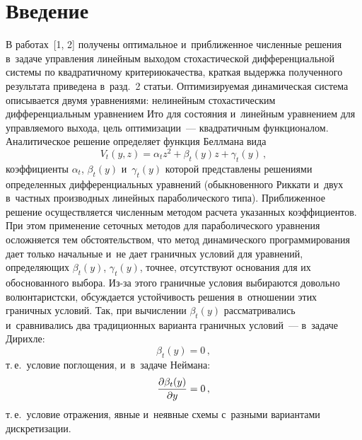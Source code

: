 
  



\thispagestyle{headings}

\begin{multicols}{2}

\label{st\stat}

\section{Введение}

     В работах~[1, 2] получены оптимальное и~при\-бли\-жен\-ное численные 
решения в~задаче управления линейным выходом стохастической 
дифференциальной системы по квадратичному критерию\linebreak качества, краткая 
выдержка полученного результата приведена в~разд.~2 статьи. 
Оптимизируемая динамическая система описывается двумя уравнениями: 
нелинейным стохастическим дифференциальным уравнением Ито для 
состояния и~линейным уравнением для управляемого выхода, цель 
оптимизации~--- квадратичным функционалом. Аналитическое решение 
определяет функция Беллмана вида 
$$
V_t(y,z)=\alpha_tz^2+\beta_t(y)z+\gamma_t(y)\,, 
$$
коэффициенты $\alpha_t$, $\beta_t(y)$ и~$\gamma_t(y)$ которой пред\-став\-ле\-ны 
решениями определенных дифференциальных уравнений (обыкновенного 
Риккати и~двух в~частных производных линейных параболического типа). 
Приближенное решение осуществляется численным методом расчета 
указанных коэффициентов. При этом применение сеточных методов для 
параболического уравнения осложняется тем обстоятельством, что метод 
динамического программирования дает только начальные и~не дает 
граничных условий для уравнений, определяющих $\beta_t(y)$, 
$\gamma_t(y)$, точнее, отсутствуют основания для их обосно\-ван\-но\-го выбора. 
Из-за этого граничные условия выбираются довольно волюнтаристски, 
обсуждается устойчивость решения в~отношении этих граничных условий. 
Так, при вычислении $\beta_t(y)$ рассматривались и~сравнивались два 
традиционных варианта граничных условий~--- в~задаче Дирихле: 
$$
\beta_t(y)=0\,,
$$
 т.\,е.\ условие поглощения, и~в~задаче Неймана: 
 $$
 \displaystyle\frac{\displaystyle \partial \beta_t(y)\mathstrut}{\displaystyle \partial y\mathstrut}=0\,,
 $$
  т.\,е.\ условие отражения, явные и~неявные схемы 
с~разными вариантами дискретизации.
     

\end{multicols}
